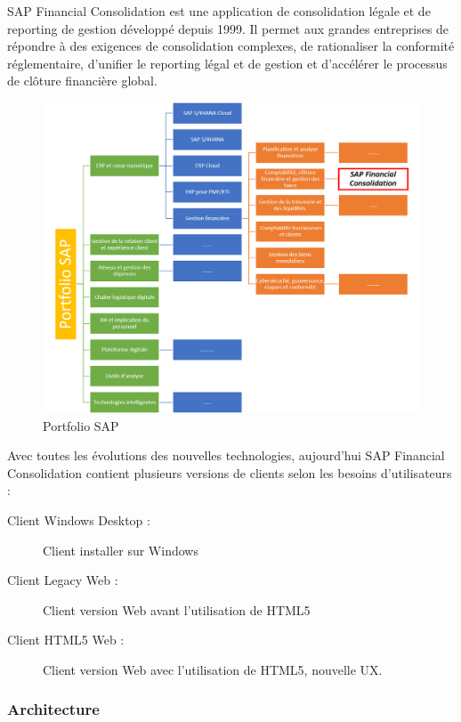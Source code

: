 \par SAP Financial Consolidation est une application de consolidation légale et de reporting de gestion développé depuis 1999. Il permet aux grandes entreprises de répondre à des exigences de consolidation complexes, de rationaliser la conformité réglementaire, d'unifier le reporting légal et de gestion et d'accélérer le processus de clôture financière global.\cite{About-FC}

\begin{figure}[H]
    \centering
    \includegraphics[width=\textwidth]{images/SAP_portfolio.png}
    \caption{Portfolio SAP}
    \label{fig:portfolioSAP_label}
\end{figure}

\par Avec toutes les évolutions des nouvelles technologies, aujourd'hui SAP Financial Consolidation contient plusieurs versions de clients selon les besoins d'utilisateurs : 
    \begin{description}
        \item [Client Windows Desktop :] Client installer sur Windows
        \item [Client Legacy Web :] Client version Web avant l'utilisation de HTML5
        \item [Client HTML5 Web :] Client version Web avec l'utilisation de HTML5, nouvelle UX.
    \end{description}
    \subsubsection{Architecture}
    
